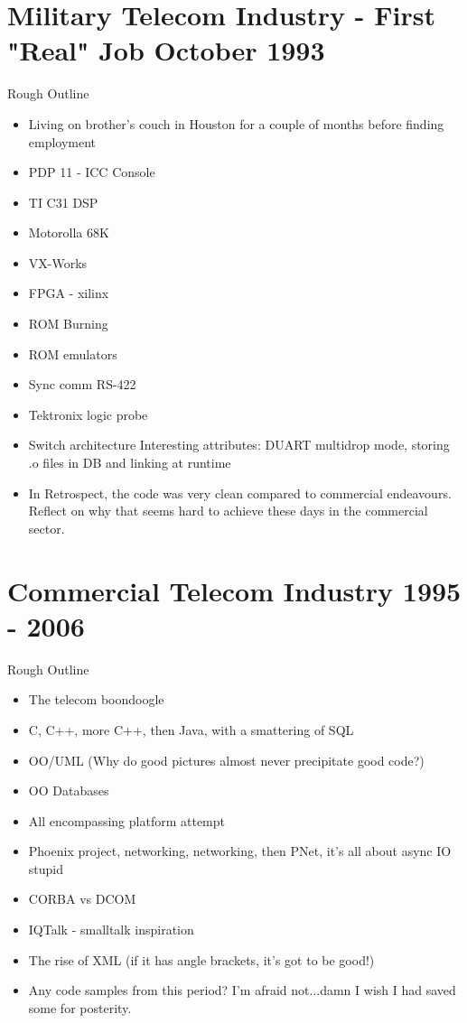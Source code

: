\section{Military Telecom Industry - First "Real" Job October 1993}
	Rough Outline
	\begin{itemize}
	\item Living on brother's couch in Houston for a couple of
          months before finding employment

	\item PDP 11 - ICC Console
	\item TI C31 DSP
	\item Motorolla 68K
	\item VX-Works
	\item FPGA - xilinx
	\item ROM Burning
	\item ROM emulators
	\item Sync comm RS-422
	\item Tektronix logic probe
	\item Switch architecture Interesting attributes: DUART
          multidrop mode, storing .o files in DB and linking at
          runtime
          \item In Retrospect, the code was very clean compared
            to commercial endeavours. Reflect on why that seems hard
            to achieve these days in the commercial sector.
	\end{itemize}

\section{Commercial Telecom Industry 1995 - 2006}
	Rough Outline
	\begin{itemize}
	\item The telecom boondoogle
	\item C, C++, more C++, then Java, with a smattering of SQL
	\item OO/UML (Why do good pictures almost never precipitate
          good code?)
        \item OO Databases
	\item All encompassing platform attempt
	\item Phoenix project, networking, networking, then PNet, it's all about async IO stupid
	\item CORBA vs DCOM
	\item IQTalk - smalltalk inspiration
	\item The rise of XML (if it has angle brackets, it's got to be good!)
	\item Any code samples from this period? 
          I'm afraid not...damn I wish I had saved some for posterity.
	\end{itemize}
